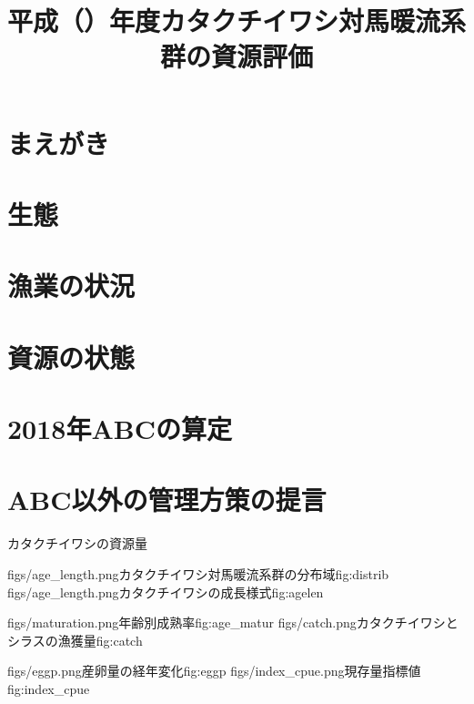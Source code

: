 \documentclass{jsarticle}
\title{平成\ThisYrJP（\ThisYr）年度カタクチイワシ対馬暖流系群の資源評価}
\author{}
\date{}
\newcommand{\ThisYr}{2018}
\begin{document}
\maketitle
\section{まえがき}
\section{生態}
\section{漁業の状況}
\section{資源の状態}
\section{\ThisYr 年ABCの算定}
\section{ABC以外の管理方策の提言}


\begin{table}[h]
\begin{center}
\caption{カタクチイワシの資源量}
\label{tbl:bmass}

\end{center}
\end{table}


\clearpage
\TwoFigs
{figs/age_length.png}{カタクチイワシ対馬暖流系群の分布域}{fig:distrib}
{figs/age_length.png}{カタクチイワシの成長様式}{fig:agelen}

\TwoFigs
{figs/maturation.png}{年齢別成熟率}{fig:age_matur}
{figs/catch.png}{カタクチイワシとシラスの漁獲量}{fig:catch}

\TwoFigs
{figs/eggp.png}{産卵量の経年変化}{fig:eggp}
{figs/index_cpue.png}{現存量指標値}{fig:index_cpue}
\end{document}
